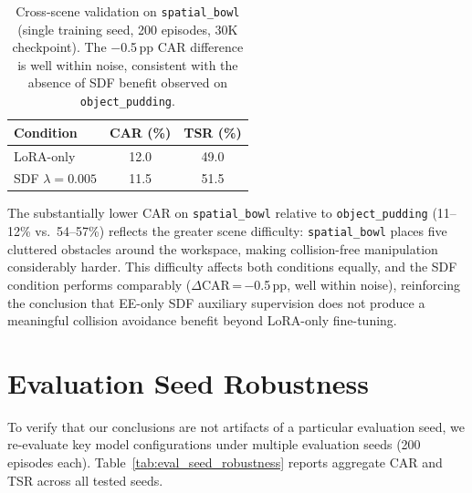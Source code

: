 \begin{table}[h]
\centering
\caption{Cross-scene validation on \texttt{spatial\_bowl} (single training seed, 200 episodes, 30K checkpoint). The $-$0.5\,pp CAR difference is well within noise, consistent with the absence of SDF benefit observed on \texttt{object\_pudding}.}
\label{tab:spatial_bowl}
\vspace{2pt}
\small
\begin{tabular}{lcc}
\toprule
Condition & CAR (\%) & TSR (\%) \\
\midrule
LoRA-only & 12.0 & 49.0 \\
SDF $\lambda{=}0.005$ & 11.5 & 51.5 \\
\bottomrule
\end{tabular}
\end{table}

The substantially lower CAR on \texttt{spatial\_bowl} relative to \texttt{object\_pudding} (11--12\% vs.\ 54--57\%) reflects the greater scene difficulty: \texttt{spatial\_bowl} places five cluttered obstacles around the workspace, making collision-free manipulation considerably harder. This difficulty affects both conditions equally, and the SDF condition performs comparably ($\Delta$CAR\,=\,$-$0.5\,pp, well within noise), reinforcing the conclusion that EE-only SDF auxiliary supervision does not produce a meaningful collision avoidance benefit beyond LoRA-only fine-tuning.


\section{Evaluation Seed Robustness}
\label{sec:appendix_eval_seed}

To verify that our conclusions are not artifacts of a particular evaluation seed, we re-evaluate key model configurations under multiple evaluation seeds (200 episodes each). Table~\ref{tab:eval_seed_robustness} reports aggregate CAR and TSR across all tested seeds.

